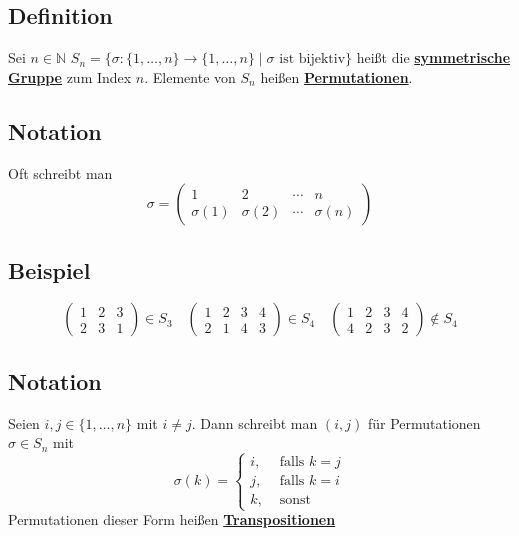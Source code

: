 \subsection{Definition} %
\label{sub:definition}
Sei $n \in \mathds{N} $ $S_n= \{ \sigma : \{ 1, \ldots , n\} \to \{ 1, \ldots , n\} \mid \sigma \text{ ist bijektiv}\}$ heißt die 
\underline{\textbf{symmetrische Gruppe}} zum Index $n$. Elemente von $S_n$ heißen \underline{\textbf{Permutationen}}.

\subsection{Notation} %
\label{sub:notation}
Oft schreibt man
\[
	\sigma = \begin{pmatrix}
		1 & 2 & \cdots & n \\
		\sigma(1) & \sigma(2) & \cdots & \sigma(n)
	\end{pmatrix}
\]

\subsection{Beispiel} %
\label{sub:beispiel}
\[
	\begin{pmatrix}
		1 & 2 & 3 \\
		2 & 3 & 1
	\end{pmatrix} \in S_3
	\quad \begin{pmatrix}
		1 & 2 & 3 & 4 \\
		2 & 1 & 4 & 3
	\end{pmatrix} \in S_4
	\quad \begin{pmatrix}
		1 & 2 & 3 & 4 \\
		4 & 2 & 3 & 2
	\end{pmatrix} \not\in S_4
\]
\subsection{Notation} %
\label{sub:notation}
Seien $i,j \in \{ 1, \ldots , n\}$ mit $i \not= j$. Dann schreibt man $(i,j)$ für Permutationen $\sigma \in S_n$ mit 
\[
	\sigma (k) = \begin{cases}
		i, &\text{ falls } k=j\\
		j , &\text{ falls } k=i \\
		k , &\text{ sonst}
	\end{cases}
\]
Permutationen dieser Form heißen \underline{\textbf{Transpositionen}}

